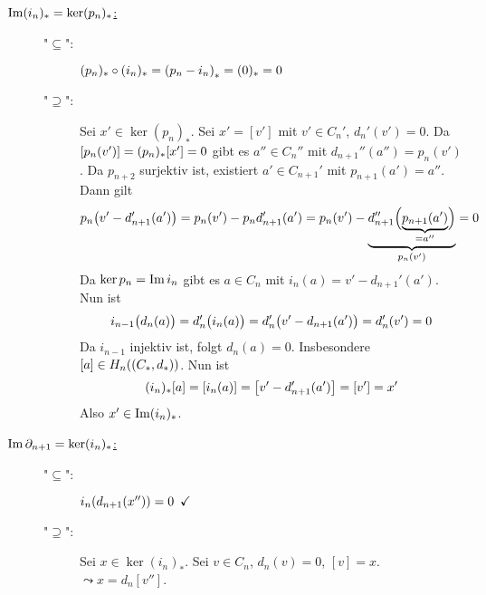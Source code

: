 \begin{description}
	\item[\uline{$\im (i_n)_* = \ker (p_n)_*$:}] 
	\begin{description}
		\item["$\subseteq$":] $(p_n)_* \circ (i_n)_* = \enbrace*{p_n-i_n}_* = (0)_* =0 $
		\item["$\supseteq$":] Sei $x' \in \ker (p_n)_*$. Sei $x'= [v']$ mit $v' \in C_n'$, $d_n'(v')=0$. Da $\benbrace*{p_n(v')}= (p_n)_* [x'] = 0$ gibt es $a'' \in C_n''$
		mit $d_{n+1}''(a'') = p_n(v')$. Da $p_{n+2}$ surjektiv ist, existiert $a' \in C_{n+1}'$ mit $p_{n+1}(a')=a''$. Dann gilt
		\begin{align*}
			p_n \enbrace*{v' - d_{n+1}'(a')} = p_n(v') - p_n d_{n+1}'(a') = p_n(v') -  \underbrace{ d_{n+1}''\enbrace[\Big]{\underbrace{p_{n+1}(a')}_{=a''}}}_{p_n(v')} = 0  
		\end{align*}
		Da $\ker p_n = \im i_n$ gibt es $a \in C_n$ mit $i_n(a)= v'- d_{n+1}'(a')$. Nun ist 
		\[
			i_{n-1} \enbrace[\big]{d_n(a)} = d_n' \enbrace[\big]{i_n(a)} = d_n' \enbrace[\big]{v'- d_{n+1}(a')}  = d_n'(v') = 0 
		\]
		Da $i_{n-1}$ injektiv ist, folgt $d_n(a)=0$. Insbesondere $[a] \in H_n \enbrace*{(C_*,d_*)}$. Nun ist 
		\[
			(i_n)_* [a] = [i_n(a)] = \benbrace*{v'- d_{n+1}'(a')} = [v'] = x' 
		\]
		Also $x' \in \im (i_n)_*$.
	\end{description}
	\item[\uline{$\im \partial_{n+1} = \ker (i_n)_*$:}] \begin{description}
		\item["$\subseteq$":] $i_n \enbrace*{d_{n+1}(x'')}= 0 \enspace\checkmark$
		\item["$\supseteq$":] Sei $x \in \ker (i_n)_*$. Sei $v \in C_n$, $d_n(v)=0$, $[v]=x$. $\leadsto x= d_n [v'']$.
	\end{description} 
\end{description}

